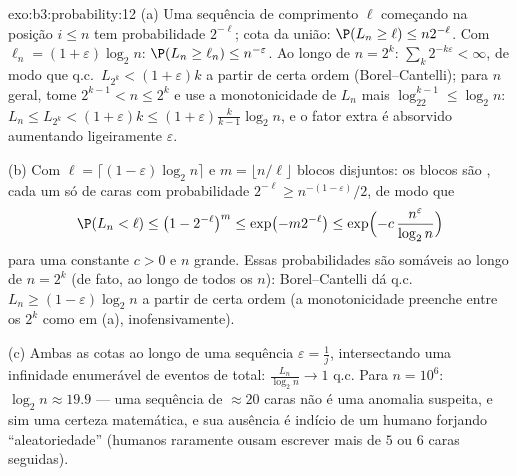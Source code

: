 \begin{solution}{exo:b3:probability:12}
(a) Uma sequência de comprimento $\ell$ começando na posição $i \leq n$
tem probabilidade $2^{-\ell}$; cota da união: $\P(L_n \geq \ell)
\leq n2^{-\ell}$. Com $\ell_n = (1 +
\varepsilon)\log_2n$: $\P(L_n \geq \ell_n) \leq
n^{-\varepsilon}$. Ao longo de $n = 2^k$:
$\sum_k2^{-k\varepsilon} < \infty$, de modo que q.c.\ $L_{2^k} <
(1+\varepsilon)k$ a partir de certa ordem (Borel--Cantelli); para
$n$ geral, tome $2^{k-1} < n \leq 2^k$ e use a monotonicidade de
$L_n$ mais $\log_22^{k-1} \leq \log_2n$: $L_n \leq L_{2^k}
< (1 + \varepsilon)k \leq (1 + \varepsilon)\frac{k}{k-1}
\log_2n$, e o fator extra é absorvido aumentando ligeiramente
$\varepsilon$.

(b) Com $\ell = \lceil(1 - \varepsilon)\log_2n\rceil$ e
$m = \lfloor n/\ell\rfloor$ blocos disjuntos: os blocos são
, cada um só de caras com probabilidade $2^{-\ell}
\geq n^{-(1-\varepsilon)}/2$, de modo que
\[
\P(L_n < \ell) \leq \bigl(1 - 2^{-\ell}\bigr)^{m}
\leq \exp\bigl(-m2^{-\ell}\bigr)
\leq \exp\Bigl(-c\,\frac{n^{\varepsilon}}{\log_2n}\Bigr)
\]
para uma constante $c > 0$ e $n$ grande. Essas probabilidades
são somáveis ao longo de $n = 2^k$ (de fato, ao longo de todos os $n$):
Borel--Cantelli dá q.c.\ $L_n \geq (1 -
\varepsilon)\log_2n$ a partir de certa ordem (a monotonicidade preenche
entre os $2^k$ como em (a), inofensivamente).

(c) Ambas as cotas ao longo de uma sequência $\varepsilon = \frac1j$,
intersectando uma infinidade enumerável de eventos de  total:
$\frac{L_n}{\log_2n} \to 1$ q.c. Para $n = 10^6$: $\log_2n
\approx 19.9$ --- uma sequência de $\approx 20$ caras não é uma
anomalia suspeita, e sim uma certeza matemática, e sua
ausência é indício de um humano forjando ``aleatoriedade'' (humanos
raramente ousam escrever mais de $5$ ou $6$ caras seguidas).
\end{solution}

